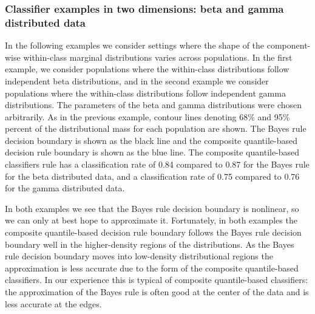 \subsubsection{Classifier examples in two dimensions: beta and gamma distributed data}
\label{sec:beta-gamma-example}

In the following examples we consider settings where the shape of the
component-wise within-class marginal distributions varies across populations.
In the first example, we consider populations where the within-class
distributions follow independent beta distributions, and in the second example
we consider populations where the within-class distributions follow independent
gamma distributions.  The parameters of the beta and gamma distributions were
chosen arbitrarily.  As in the previous example, contour lines denoting 68\% and
95\% percent of the distributional mass for each population are shown.  The
Bayes rule decision boundary is shown as the black line and the composite
quantile-based decision rule boundary is shown as the blue line.  The composite
quantile-based classifiers rule has a classification rate of 0.84 compared to
0.87 for the Bayes rule for the beta distributed data, and a classification rate
of 0.75 compared to 0.76 for the gamma distributed data.

In both examples we see that the Bayes rule decision boundary is nonlinear, so
we can only at best hope to approximate it.  Fortunately, in both examples the
composite quantile-based decision rule boundary follows the Bayes rule decision
boundary well in the higher-density regions of the distributions.  As the Bayes
rule decision boundary moves into low-density distributional regions the
approximation is less accurate due to the form of the composite quantile-based
classifiers.  In our experience this is typical of composite quantile-based
classifiers: the approximation of the Bayes rule is often good at the center of
the data and is less accurate at the edges.

